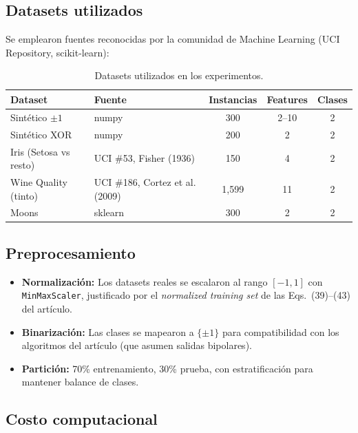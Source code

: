 \documentclass[12pt,a4paper]{article}
\begin{document}
\subsection{Datasets utilizados}

Se emplearon fuentes reconocidas por la comunidad de Machine Learning (UCI Repository, scikit-learn):

\begin{table}[H]
\centering
\begin{tabular}{@{}llccc@{}}
\toprule
\textbf{Dataset} & \textbf{Fuente} & \textbf{Instancias} & \textbf{Features} & \textbf{Clases} \\
\midrule
Sintético $\pm1$ & numpy & 300 & 2--10 & 2 \\
Sintético XOR & numpy & 200 & 2 & 2 \\
Iris (Setosa vs resto) & UCI \#53, Fisher (1936) & 150 & 4 & 2 \\
Wine Quality (tinto)\footnotemark & UCI \#186, Cortez et al. (2009) & 1,599 & 11 & 2 \\
Moons & sklearn & 300 & 2 & 2 \\
\bottomrule
\end{tabular}
\caption{Datasets utilizados en los experimentos.}
\label{tab:datasets}
\end{table}

\subsection{Preprocesamiento}

\begin{itemize}[leftmargin=*]
    \item \textbf{Normalización:} Los datasets reales se escalaron al rango $[-1, 1]$ con \texttt{MinMaxScaler}, justificado por el \textit{normalized training set} de las Eqs.~(39)--(43) del artículo.
    \item \textbf{Binarización:} Las clases se mapearon a $\{\pm1\}$ para compatibilidad con los algoritmos del artículo (que asumen salidas bipolares).
    \item \textbf{Partición:} 70\% entrenamiento, 30\% prueba, con estratificación para mantener balance de clases.
\end{itemize}

\subsection{Costo computacional}
\end{document}

